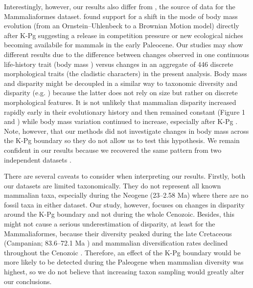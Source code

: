 \documentclass[12pt,letterpaper]{article}
\begin{document}
Interestingly, however, our results also differ from \cite{Slater2012MEE}, the source of data for the Mammaliaformes dataset.
\cite{Slater2012MEE} found support for a shift in the mode of body mass evolution (from an Ornstein--Uhlenbeck to a Brownian Motion model) directly after K-Pg suggesting a release in competition pressure or new ecological niches becoming availabile for mammals in the early Paleocene.
Our studies may show different results due to the difference between changes observed in one continuous life-history trait (body mass \cite{Slater2012MEE}) versus changes in an aggregate of 446 discrete morphological traits (the cladistic characters) in the present analysis.
Body mass and disparity might be decoupled in a similar way to taxonomic diversity and disparity (e.g. \cite{slaterCetacean,ruta2013,hopkinsdecoupling2013}) because the latter does not rely on size but rather on discrete morphological features.
It is not unlikely that mammalian disparity increased rapidly early in their evolutionary history and then remained constant (Figure 1 and \cite{Close2015,Lee2015R759}) while body mass variation continued to increase, especially after K-Pg \cite{Slater2012MEE}.
Note, however, that our methods did not investigate changes in body mass across the K-Pg boundary so they do not allow us to test this hypothesis.
We remain confident in our results because we recovered the same pattern from two independent datasets \cite{Slater2012MEE,beckancient2014}.

There are several caveats to consider when interpreting our results. 
Firstly, both our datasets are limited taxonomically.
They do not represent all known mammalian taxa, especially during the Neogene (23--2.58 Ma) where there are no fossil taxa in either dataset.
Our study, however, focuses on changes in disparity around the K-Pg boundary and not during the whole Cenozoic.
Besides, this might not cause a serious underestimation of disparity, at least for the Mammaliaformes, because their diversity peaked during the late Cretaceous (Campanian; 83.6--72.1 Ma \cite{Newham201432}) and mammalian diversification rates declined throughout the Cenozoic \cite{Raia2012}.
Therefore, an effect of the K-Pg boundary would be more likely to be detected during the Paleogene when mammalian diversity was highest, so we do not believe that increasing taxon sampling would greatly alter our conclusions.
\end{document}
